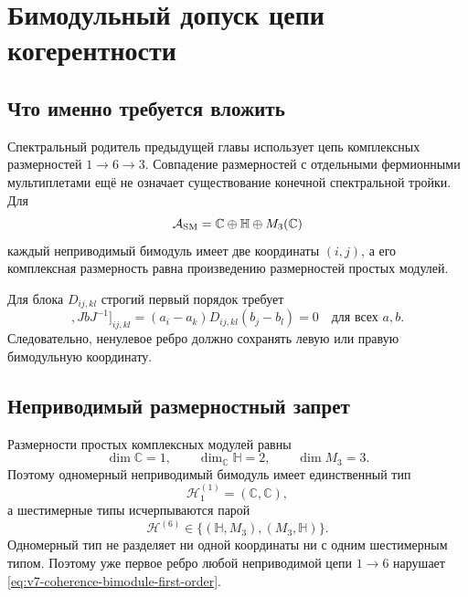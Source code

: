 \chapter{Бимодульный допуск цепи когерентности}
\label{ch:v7-edge-coherence-bimodule-admission-gate}

\section{Что именно требуется вложить}

Спектральный родитель предыдущей главы использует цепь комплексных
размерностей $1\to6\to3$. Совпадение размерностей с отдельными
фермионными мультиплетами ещё не означает существование конечной
спектральной тройки. Для
\begin{equation}
 \mathcal A_{\rm SM}
 =\mathbb C\oplus\mathbb H\oplus M_3(\mathbb C)
 \label{eq:v7-coherence-bimodule-algebra}
\end{equation}
каждый неприводимый бимодуль имеет две координаты $(i,j)$, а его
комплексная размерность равна произведению размерностей простых модулей.

Для блока $D_{ij,kl}$ строгий первый порядок требует
\begin{equation}
 [[D,a],JbJ^{-1}]_{ij,kl}
 =(a_i-a_k)D_{ij,kl}(b_j-b_l)=0
 \quad\text{для всех }a,b.
 \label{eq:v7-coherence-bimodule-first-order}
\end{equation}
Следовательно, ненулевое ребро должно сохранять левую или правую
бимодульную координату.

\section{Неприводимый размерностный запрет}

Размерности простых комплексных модулей равны
\begin{equation}
 \dim\mathbb C=1,\qquad
 \dim_{\mathbb C}\mathbb H=2,\qquad
 \dim M_3=3.
 \label{eq:v7-coherence-bimodule-simple-dimensions}
\end{equation}
Поэтому одномерный неприводимый бимодуль имеет единственный тип
\begin{equation}
 \mathcal H_1^{(1)}=(\mathbb C,\mathbb C),
 \label{eq:v7-coherence-bimodule-one-dimensional}
\end{equation}
а шестимерные типы исчерпываются парой
\begin{equation}
 \mathcal H^{(6)}
 \in\{(\mathbb H,M_3),(M_3,\mathbb H)\}.
 \label{eq:v7-coherence-bimodule-six-dimensional}
\end{equation}
Одномерный тип не разделяет ни одной координаты ни с одним шестимерным
типом. Поэтому уже первое ребро любой неприводимой цепи $1\to6$ нарушает
\eqref{eq:v7-coherence-bimodule-first-order}.

